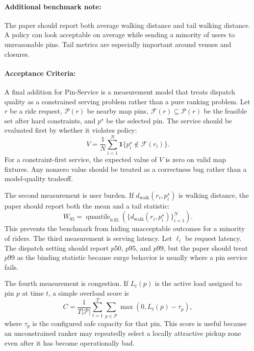 \documentclass{article}
\begin{document}
\paragraph{Additional benchmark note:}

The paper should report both average walking distance and tail walking distance. A policy can look acceptable on average while sending a minority of users to unreasonable pins. Tail metrics are especially important around venues and closures.

\paragraph{Acceptance Criteria:}

A final addition for Pin-Service is a measurement model that treats dispatch quality as a constrained serving problem rather than a pure ranking problem. Let $r$ be a ride request, $\mathcal{P}(r)$ be nearby map pins, $\mathcal{F}(r)\subseteq \mathcal{P}(r)$ be the feasible set after hard constraints, and $p^\star$ be the selected pin. The service should be evaluated first by whether it violates policy:
\begin{equation}
  V =
  \frac{1}{N}\sum_{i=1}^{N}
  \mathbf{1}\{p_i^\star \notin \mathcal{F}(r_i)\}.
\end{equation}
For a constraint-first service, the expected value of $V$ is zero on valid map fixtures. Any nonzero value should be treated as a correctness bug rather than a model-quality tradeoff.

The second measurement is user burden. If $d_{\mathrm{walk}}(r_i,p_i^\star)$ is walking distance, the paper should report both the mean and a tail statistic:
\begin{equation}
  W_{95} =
  \operatorname{quantile}_{0.95}
  \left(
    \{d_{\mathrm{walk}}(r_i,p_i^\star)\}_{i=1}^{N}
  \right).
\end{equation}
This prevents the benchmark from hiding unacceptable outcomes for a minority of riders. The third measurement is serving latency. Let $\ell_i$ be request latency. The dispatch setting should report $p50$, $p95$, and $p99$, but the paper should treat $p99$ as the binding statistic because surge behavior is usually where a pin service fails.

The fourth measurement is congestion. If $L_t(p)$ is the active load assigned to pin $p$ at time $t$, a simple overload score is
\begin{equation}
  C =
  \frac{1}{T|\mathcal{P}|}
  \sum_{t=1}^{T}
  \sum_{p\in\mathcal{P}}
  \max(0, L_t(p)-\tau_p),
\end{equation}
where $\tau_p$ is the configured safe capacity for that pin. This score is useful because an unconstrained ranker may repeatedly select a locally attractive pickup zone even after it has become operationally bad.
\end{document}
